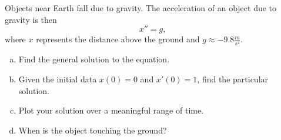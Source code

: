 \documentclass[12pt]{article} %
\begin{document}
\newpage
\begin{problem}
Objects near Earth fall due to gravity.  The acceleration of an object due to gravity is then
\[
x''=g,
\]
where $x$ represents the distance above the ground and $g\approx -9.8\frac{m}{s^2}$.  
\begin{enumerate}[(a)]
    \item Find the general solution to the equation.
    \item Given the initial data $x(0)=0$ and $x'(0)=1$, find the particular solution.
    \item Plot your solution over a meaningful range of time.
    \item When is the object touching the ground?
\end{enumerate}

\end{problem}
\end{document}
